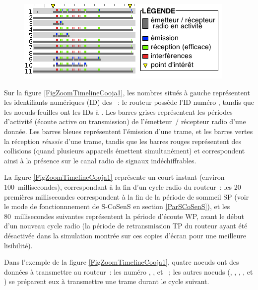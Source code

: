 \begin{figure}[pbt]
\centering
\includegraphics{images/ch5-s-cosens-timeline-1.png}
\label{FigZoomTimelineCooja1}
\end{figure}


Sur la figure \vref{FigZoomTimelineCooja1}, les nombres situés à gauche
représentent les identifiants numériques (ID) des ~: le routeur
possède l'ID numéro , tandis que les noeuds-feuilles ont les IDs
 à . Les barres grises représentent les périodes
d'activité (écoute active ou transmission) de l'émetteur~/ récepteur radio
d'une  donnée. Les barres bleues représentent l'émission d'une
trame, et les barres vertes la réception \emph{réussie} d'une trame,
tandis que les barres rouges représentent des collisions (quand plusieurs
appareils émettent simultanément) et correspondent ainsi à la présence
sur le canal radio de signaux indéchiffrables.

La figure \vref{FigZoomTimelineCooja1} représente un court instant
(environ 100~millisecondes), correspondant à la fin d'un cycle radio du
routeur~: les 20 premières millisecondes correspondent à la fin de la
période  de sommeil SP (voir le mode de fonctionnnement de S-CoSenS en
section \vref{ParSCoSenS}), et les 80~millisecondes suivantes
représentent la période d'écoute WP, avant le début d'un nouveau cycle
radio (la période de retransmission TP du routeur ayant été désactivée
dans la simulation montrée sur ces copies d'écran pour une meilleure
lisibilité).

Dans l'exemple de la figure \vref{FigZoomTimelineCooja1}, quatre noeuds
ont des données à transmettre au routeur~: les  numéro ,
,  et ~; les autres noeuds (,
, , ,  et ) se préparent
eux à transmettre une trame durant le cycle suivant.

